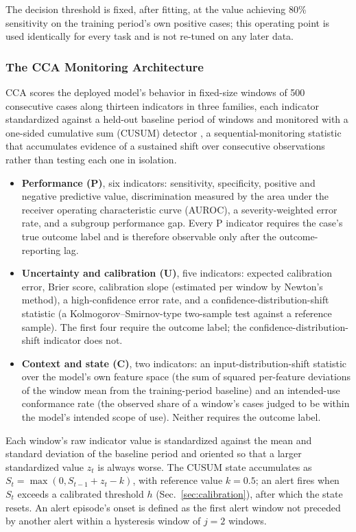 \documentclass[apajournal,article,submit,oneauthor]{Definitions/mdpi}
\begin{document}
The decision threshold is fixed, after fitting, at the value achieving 80\% sensitivity on the training period's own positive cases; this operating point is used identically for every task and is not re-tuned on any later data.

\subsubsection{The CCA Monitoring Architecture}\label{sec:indicators}

CCA scores the deployed model's behavior in fixed-size windows of 500 consecutive cases along thirteen indicators in three families, each indicator standardized against a held-out baseline period of windows and monitored with a one-sided cumulative sum (CUSUM) detector \citep{page1954}, a sequential-monitoring statistic that accumulates evidence of a sustained shift over consecutive observations rather than testing each one in isolation.

\begin{itemize}
\item \textbf{Performance (P)}, six indicators: sensitivity, specificity, positive and negative predictive value, discrimination measured by the area under the receiver operating characteristic curve (AUROC), a severity-weighted error rate, and a subgroup performance gap. Every P indicator requires the case's true outcome label and is therefore observable only after the outcome-reporting lag.
\item \textbf{Uncertainty and calibration (U)}, five indicators: expected calibration error, Brier score, calibration slope (estimated per window by Newton's method), a high-confidence error rate, and a confidence-distribution-shift statistic (a Kolmogorov--Smirnov-type two-sample test against a reference sample). The first four require the outcome label; the confidence-distribution-shift indicator does not.
\item \textbf{Context and state (C)}, two indicators: an input-distribution-shift statistic over the model's own feature space (the sum of squared per-feature deviations of the window mean from the training-period baseline) and an intended-use conformance rate (the observed share of a window's cases judged to be within the model's intended scope of use). Neither requires the outcome label.
\end{itemize}

Each window's raw indicator value is standardized against the mean and standard deviation of the baseline period and oriented so that a larger standardized value $z_t$ is always worse. The CUSUM state accumulates as $S_t = \max(0, S_{t-1} + z_t - k)$, with reference value $k = 0.5$; an alert fires when $S_t$ exceeds a calibrated threshold $h$ (Sec.~\ref{sec:calibration}), after which the state resets. An alert episode's onset is defined as the first alert window not preceded by another alert within a hysteresis window of $j = 2$ windows.
\end{document}
